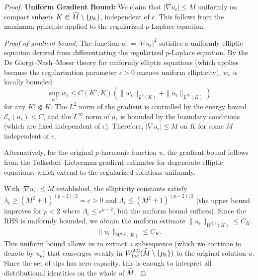 \begin{proof}
\textbf{Uniform Gradient Bound:} We claim that $|\nabla u_\epsilon| \le M$ uniformly on compact subsets $K \Subset \widetilde{M} \setminus \{p_k\}$, independent of $\epsilon$. This follows from the maximum principle applied to the regularized $p$-Laplace equation.

\textit{Proof of gradient bound:} The function $w_\epsilon = |\nabla u_\epsilon|^2$ satisfies a uniformly elliptic equation derived from differentiating the regularized $p$-Laplace equation. By the De Giorgi--Nash--Moser theory for uniformly elliptic equations (which applies because the regularization parameter $\epsilon > 0$ ensures uniform ellipticity), $w_\epsilon$ is locally bounded:
\[
    \sup_{K'} w_\epsilon \le C(K', K) \left( \|w_\epsilon\|_{L^2(K)} + \|u_\epsilon\|_{L^\infty(K)} \right)
\]
for any $K' \Subset K$. The $L^2$ norm of the gradient is controlled by the energy bound $\mathcal{E}_\epsilon(u_\epsilon) \le C$, and the $L^\infty$ norm of $u_\epsilon$ is bounded by the boundary conditions (which are fixed independent of $\epsilon$). Therefore, $|\nabla u_\epsilon| \le M$ on $K$ for some $M$ independent of $\epsilon$.

Alternatively, for the original $p$-harmonic function $u$, the gradient bound follows from the Tolksdorf--Lieberman gradient estimates \cite{tolksdorf1984,lieberman1988} for degenerate elliptic equations, which extend to the regularized solutions uniformly.

With $|\nabla u_\epsilon| \le M$ established, the ellipticity constants satisfy $\lambda_\epsilon \ge (M^2+1)^{(p-2)/2} = c > 0$ and $\Lambda_\epsilon \le (M^2+1)^{(p-2)/2}$ (the upper bound improves for $p < 2$ where $\Lambda_\epsilon \le \epsilon^{p-2}$, but the uniform bound suffices).
Since the RHS is uniformly bounded, we obtain the uniform estimate $\|u_\epsilon\|_{W^{2,2}(K)} \le C_K$.
\begin{equation}
    \| u_\epsilon \|_{W^{2,2}(K)} \le C_K.
\end{equation}
This uniform bound allows us to extract a subsequence (which we continue to denote by $u_\epsilon$) that converges weakly in $W^{2,2}_{loc}(\widetilde{M}\setminus\{p_k\})$ to the original solution $u$. Since the set of tips has zero capacity, this is enough to interpret all distributional identities on the whole of $\widetilde{M}$.


\end{proof}
